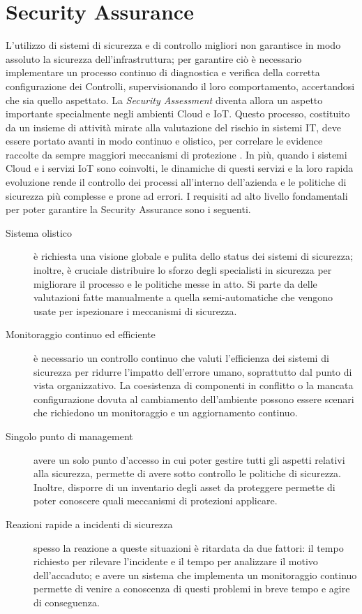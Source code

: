 \section{Security Assurance}
L'utilizzo di sistemi di sicurezza e di controllo migliori non garantisce in modo assoluto la sicurezza dell'infrastruttura; 
per garantire ciò è necessario implementare un processo continuo di diagnostica e verifica della corretta configurazione dei Controlli, 
supervisionando il loro comportamento, accertandosi che sia quello aspettato.
\vspace{0.5 cm}
\hfill\break
La \textit{Security Assessment} diventa allora un aspetto importante specialmente negli ambienti Cloud e IoT. Questo processo, costituito
da un insieme di attività mirate alla valutazione del rischio in sistemi IT, deve essere portato avanti in modo continuo e olistico, per 
correlare le evidence raccolte da sempre maggiori meccanismi di protezione \cite{mooncloud-semi-automatic-and-trustworthy}.\hfill\break
In più, quando i sistemi Cloud e i servizi IoT sono coinvolti, le dinamiche di questi servizi e la loro rapida evoluzione rende il 
controllo dei processi all'interno dell'azienda e le politiche di sicurezza più complesse e prone ad errori.
\vspace{0.5 cm}
\hfill\break
I requisiti ad alto livello fondamentali per poter garantire la Security Assurance sono i seguenti.
\begin{description}
    \item[Sistema olistico] è richiesta una visione globale e pulita dello status dei sistemi di sicurezza; inoltre, è cruciale 
    distribuire lo sforzo degli specialisti in sicurezza per migliorare il processo e le politiche messe in atto. Si parte da 
    delle valutazioni fatte manualmente a quella semi-automatiche che vengono usate per ispezionare i meccanismi di sicurezza. 
    \item[Monitoraggio continuo ed efficiente] è necessario un controllo continuo che valuti l'efficienza dei sistemi di sicurezza 
    per ridurre l'impatto dell'errore umano, soprattutto dal punto di vista organizzativo. La coesistenza di componenti in conflitto o
    la mancata configurazione dovuta al cambiamento dell'ambiente possono essere scenari che richiedono un monitoraggio e un 
    aggiornamento continuo.
    \item[Singolo punto di management] avere un solo punto d'accesso in cui poter gestire tutti gli aspetti relativi alla sicurezza, 
    permette di avere sotto controllo le politiche di sicurezza. Inoltre, disporre di un inventario degli asset da proteggere permette di
    poter conoscere quali meccanismi di protezioni applicare.
    \item[Reazioni rapide a incidenti di sicurezza] spesso la reazione a queste situazioni è ritardata da due fattori: il tempo 
    richiesto per rilevare l'incidente e il tempo per analizzare il motivo dell'accaduto; e avere un sistema che implementa un monitoraggio
    continuo permette di venire a conoscenza di questi problemi in breve tempo e agire di conseguenza.
    \label{list:security-assurance-fondamentals}
\end{description}
%
